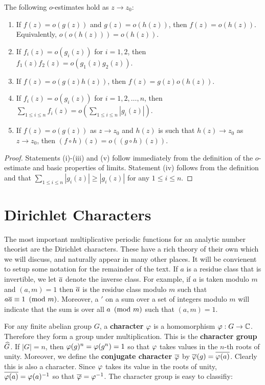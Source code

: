         \begin{proposition}\label{prop:Little_Oh_manipulations}
            The following $o$-estimates hold as $z \to z_{0}$:
            \begin{enumerate}[label=(\roman*)]
              \item If $f(z) = o(g(z))$ and $g(z) = o(h(z))$, then $f(z) = o(h(z))$. Equivalently, $o(o(h(z))) = o(h(z))$.
              \item If $f_{i}(z) = o(g_{i}(z))$ for $i = 1,2$, then $f_{1}(z)f_{2}(z) = o(g_{1}(z)g_{2}(z))$.
              \item If $f(z) = o(g(z)h(z))$, then $f(z) = g(z)o(h(z))$.
              \item If $f_{i}(z) = o(g_{i}(z))$ for $i = 1,2,\ldots,n$, then $\sum_{1 \le i \le n}f_{i}(z) = o\left(\sum_{1 \le i \le n}|g_{i}(z)|\right)$.
              \item If $f(z) = o(g(z))$ as $z \to z_{0}$ and $h(z)$ is such that $h(z) \to z_{0}$ as $z \to z_{0}$, then $(f \circ h)(z) = o((g \circ h)(z))$.
            \end{enumerate}
        \end{proposition}
        \begin{proof}
          Statements (i)-(iii) and (v) follow immediately from the definition of the $o$-estimate and basic properties of limits. Statement (iv) follows from the definition and that $\sum_{1 \le i \le n}|g_{i}(z)| \ge |g_{i}(z)|$ for any $1 \le i \le n$.
        \end{proof}
    \section{Dirichlet Characters}
      The most important multiplicative periodic functions for an analytic number theorist are the Dirichlet characters. These have a rich theory of their own which we will discuss, and naturally appear in many other places. It will be convienent to setup some notation for the remainder of the text. If $a$ is a residue class that is invertible, we let $\overline{a}$ denote the inverse class. For example, if $a$ is taken modulo $m$ and $(a,m) = 1$ then $\overline{a}$ is the residue class modulo $m$ such that $a\overline{a} \equiv 1 \ \left(\text{mod }m\right)$. Moreover, a $'$ on a sum over a set of integers modulo $m$ will indicate that the sum is over all $a \ \left(\text{mod }m\right)$ such that $(a,m) = 1$.

      For any finite abelian group $G$, a \textbf{character} $\varphi$ is a homomorphism $\varphi:G \to \mathbb{C}$. Therefore they form a group under multiplication. This is the \textbf{character group} $\widehat{G}$. If $|G| = n$, then $\varphi(g)^{n} = \varphi(g^{n}) = 1$ so that $\varphi$ takes values in the $n$-th roots of unity. Moreover, we define the \textbf{conjugate character} $\overline{\varphi}$ by $\overline{\varphi}(g) = \overline{\varphi(a)}$. Clearly this is also a character. Since $\varphi$ takes its value in the roots of unity, $\overline{\varphi(a)} = \varphi(a)^{-1}$ so that $\overline{\varphi} = \varphi^{-1}$. The character group is easy to classifiy:

